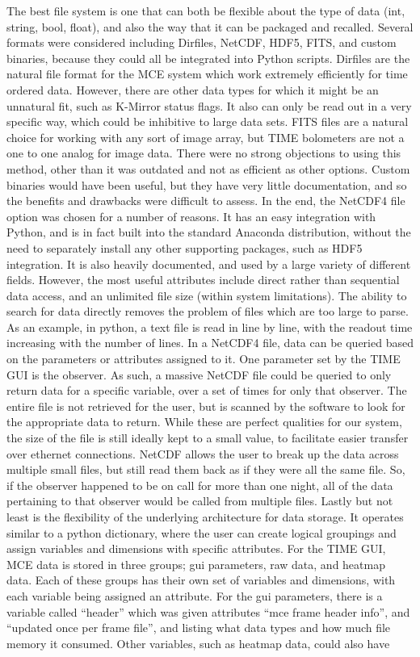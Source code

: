 \documentclass[manuscript]{aastex}
\begin{document}
The best file system is one that can both be flexible about the type of data (int, string, bool, float), and also the way that it can be packaged and recalled. Several formats were considered including Dirfiles, NetCDF, HDF5, FITS, and custom binaries, because they could all be integrated into Python scripts. Dirfiles are the natural file format for the MCE system which work extremely efficiently for time ordered data. However, there are other data types for which it might be an unnatural fit, such as K-Mirror status flags. It also can only be read out in a very specific way, which could be inhibitive to large data sets. FITS files are a natural choice for working with any sort of image array, but TIME bolometers are not a one to one analog for image data. There were no strong objections to using this method, other than it was outdated and not as efficient as other options. Custom binaries would have been useful, but they have very little documentation, and so the benefits and drawbacks were difficult to assess. In the end, the NetCDF4 file option was chosen for a number of reasons. It has an easy integration with Python, and is in fact built into the standard {\sc Anaconda} distribution, without the need to separately install any other supporting packages, such as HDF5 integration. It is also heavily documented, and used by a large variety of different fields. However, the most useful attributes include direct rather than sequential data access, and an unlimited file size (within system limitations). The ability to search for data directly removes the problem of files which are too large to parse. As an example, in python, a text file is read in line by line, with the readout time increasing with the number of lines. In a NetCDF4 file, data can be queried based on the parameters or attributes assigned to it. One parameter set by the TIME GUI is the observer. As such, a massive NetCDF file could be queried to only return data for a specific variable, over a set of times for only that observer. The entire file is not retrieved for the user, but is scanned by the software to look for the appropriate data to return. While these are perfect qualities for our system, the size of the file is still ideally kept to a small value, to facilitate easier transfer over ethernet connections. NetCDF allows the user to break up the data across multiple small files, but still read them back as if they were all the same file. So, if the observer happened to be on call for more than one night, all of the data pertaining to that observer would be called from multiple files. Lastly but not least is the flexibility of the underlying architecture for data storage. It operates similar to a python dictionary, where the user can create logical groupings and assign variables and dimensions with specific attributes. For the TIME GUI, MCE data is stored in three groups; gui parameters, raw data, and heatmap data. Each of these groups has their own set of variables and dimensions, with each variable being assigned an attribute. For the gui parameters, there is a variable called ``header'' which was given attributes ``mce frame header info'', and ``updated once per frame file'', and listing what data types and how much file memory it consumed. Other variables, such as heatmap data, could also have 
\end{document}
